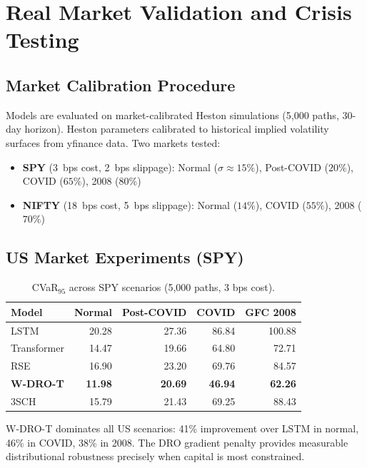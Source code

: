 \section{Real Market Validation and Crisis Testing}
\label{sec:crisis}

\subsection{Market Calibration Procedure}

Models are evaluated on market-calibrated Heston simulations (5,000 paths, 30-day horizon). Heston parameters calibrated to historical implied volatility surfaces from yfinance data. Two markets tested:
\begin{itemize}[noitemsep]
    \item \textbf{SPY} (3~bps cost, 2~bps slippage): Normal ($\sigma \approx 15\%$), Post-COVID ($20\%$), COVID ($65\%$), 2008 ($80\%$)
    \item \textbf{NIFTY} (18~bps cost, 5~bps slippage): Normal ($14\%$), COVID ($55\%$), 2008 ($70\%$)
\end{itemize}

\subsection{US Market Experiments (SPY)}

\begin{table}[H]
\centering\small
\caption{CVaR$_{95}$ across SPY scenarios (5,000 paths, 3 bps cost).}
\label{tab:spy}
\begin{tabular}{@{}lrrrr@{}}
\toprule
\textbf{Model} & \textbf{Normal} & \textbf{Post-COVID} & \textbf{COVID} & \textbf{GFC 2008} \\\midrule
LSTM & 20.28 & 27.36 & 86.84 & 100.88 \\
Transformer & 14.47 & 19.66 & 64.80 & 72.71 \\
RSE & 16.90 & 23.20 & 69.76 & 84.57 \\
\textbf{W-DRO-T} & \textbf{11.98} & \textbf{20.69} & \textbf{46.94} & \textbf{62.26} \\
3SCH & 15.79 & 21.43 & 69.25 & 88.43 \\
\bottomrule
\end{tabular}
\end{table}

W-DRO-T dominates all US scenarios: 41\% improvement over LSTM in normal, 46\% in COVID, 38\% in 2008. The DRO gradient penalty provides measurable distributional robustness precisely when capital is most constrained.

